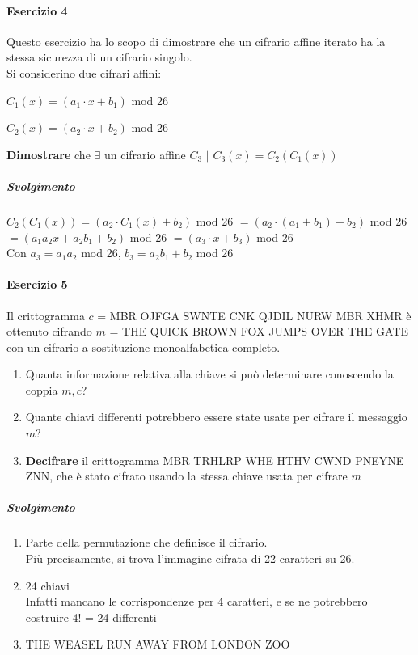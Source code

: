 \documentclass[10pt]{book}
\begin{document}
\paragraph{Esercizio 4} Questo esercizio ha lo scopo di dimostrare che un cifrario affine iterato ha la stessa sicurezza di un cifrario singolo.\\
Si considerino due cifrari affini:
\begin{list}{}{}
	\item $C_1(x) = (a_1\cdot x + b_1)$ mod 26
	\item $C_2(x) = (a_2\cdot x + b_2)$ mod 26
\end{list}
\textbf{Dimostrare} che $\exists$ un cifrario affine $C_3$ $|$ $C_3(x) = C_2(C_1(x))$
\subparagraph{Svolgimento}
$C_2(C_1(x)) = (a_2\cdot C_1(x) + b_2)$ mod 26 $= (a_2\cdot(a_1 + b_1) + b_2)$ mod 26\\$= (a_1a_2x + a_2b_1 + b_2)$ mod 26 $= (a_3\cdot x + b_3)$ mod 26\\
Con $a_3 = a_1a_2$ mod 26, $b_3 = a_2b_1 + b_2$ mod 26
\paragraph{Esercizio 5} Il crittogramma $c$ = MBR OJFGA SWNTE CNK QJDIL NURW MBR XHMR è ottenuto cifrando $m$ = THE QUICK BROWN FOX JUMPS OVER THE GATE con un cifrario a sostituzione monoalfabetica completo.
\begin{enumerate}
	\item Quanta informazione relativa alla chiave si può determinare conoscendo la coppia $m, c$?
	\item Quante chiavi differenti potrebbero essere state usate per cifrare il messaggio $m$?
	\item \textbf{Decifrare} il crittogramma MBR TRHLRP WHE HTHV CWND PNEYNE ZNN, che è stato cifrato usando la stessa chiave usata per cifrare $m$
\end{enumerate}
\subparagraph{Svolgimento}
\begin{enumerate}
	\item Parte della permutazione che definisce il cifrario.\\
	Più precisamente, si trova l'immagine cifrata di 22 caratteri su 26.
	\item 24 chiavi\\
	Infatti mancano le corrispondenze per 4 caratteri, e se ne potrebbero costruire 4! = 24 differenti
	\item THE WEASEL RUN AWAY FROM LONDON ZOO
\end{enumerate}
\pagebreak
\end{document}
